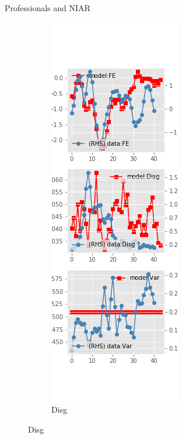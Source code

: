 \documentclass{beamer}
\begin{document}
\begin{frame}{Professionals and NIAR}
\begin{figure}[ht]
\begin{subfigure}[b]{0.2\textwidth}
		\end{subfigure}
		\hfill
		\begin{subfigure}[b]{0.2\textwidth}
			\caption{Disg}
			\includegraphics[width=\textwidth, height = 0.8\textheight]{figuresDraft/spf_ni_est_diag1.png}

\end{subfigure}
\end{figure}
\end{frame}
\end{document}
